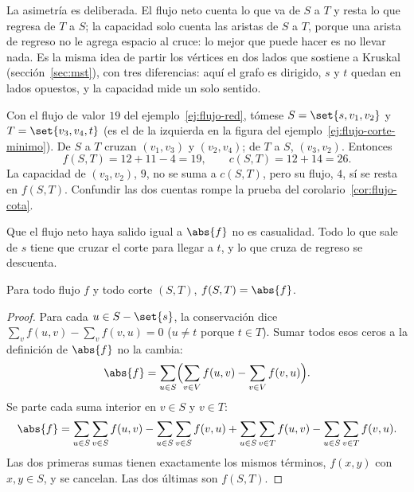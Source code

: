 \documentclass[11pt,letterpaper]{article}
\begin{document}
La asimetría es deliberada. El flujo neto cuenta lo que va de $S$ a
$T$ y resta lo que regresa de $T$ a $S$; la capacidad solo cuenta las
aristas de $S$ a $T$, porque una arista de regreso no le agrega
espacio al cruce: lo mejor que puede hacer es no llevar nada. Es la
misma idea de partir los vértices en dos lados que sostiene a Kruskal
(sección~\ref{sec:mst}), con tres diferencias: aquí el grafo es
dirigido, $s$ y $t$ quedan en lados opuestos, y la capacidad mide un
solo sentido.

\begin{ejemplo}\label{ej:flujo-corte}
  Con el flujo de valor $19$ del ejemplo~\ref{ej:flujo-red}, tómese
  $S = \set{s, v_1, v_2}$ y $T = \set{v_3, v_4, t}$ (es el de la
  izquierda en la figura del ejemplo~\ref{ej:flujo-corte-minimo}). De
  $S$ a $T$ cruzan $(v_1, v_3)$ y $(v_2, v_4)$; de $T$ a $S$,
  $(v_3, v_2)$. Entonces
  \[
    f(S, T) = 12 + 11 - 4 = 19 , \qquad c(S, T) = 12 + 14 = 26 .
  \]
  La capacidad de $(v_3, v_2)$, $9$, no se suma a $c(S, T)$, pero su
  flujo, $4$, sí se resta en $f(S, T)$. Confundir las dos cuentas
  rompe la prueba del corolario~\ref{cor:flujo-cota}.
\end{ejemplo}

Que el flujo neto haya salido igual a $\abs{f}$ no es casualidad. Todo
lo que sale de $s$ tiene que cruzar el corte para llegar a $t$, y lo
que cruza de regreso se descuenta.

\begin{lema}\label{lem:flujo-neto-corte}
  Para todo flujo $f$ y todo corte $(S, T)$, $f(S, T) = \abs{f}$.
\end{lema}

\begin{proof}
  Para cada $u \in S - \set{s}$, la conservación dice
  $\sum_{v} f(u, v) - \sum_{v} f(v, u) = 0$ ($u \ne t$ porque
  $t \in T$). Sumar todos esos ceros a la definición de $\abs{f}$ no
  la cambia:
  \[
    \abs{f} = \sum_{u \in S} \Bigl( \sum_{v \in V} f(u, v)
              - \sum_{v \in V} f(v, u) \Bigr) .
  \]
  Se parte cada suma interior en $v \in S$ y $v \in T$:
  \[
    \abs{f} = \sum_{u \in S} \sum_{v \in S} f(u, v)
            - \sum_{u \in S} \sum_{v \in S} f(v, u)
            + \sum_{u \in S} \sum_{v \in T} f(u, v)
            - \sum_{u \in S} \sum_{v \in T} f(v, u) .
  \]
  Las dos primeras sumas tienen exactamente los mismos términos,
  $f(x, y)$ con $x, y \in S$, y se cancelan. Las dos últimas son
  $f(S, T)$.
\end{proof}
\end{document}
